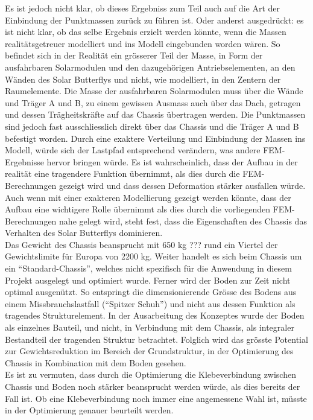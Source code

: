 Es ist jedoch nicht klar, ob dieses Ergebniss zum Teil auch auf die Art der Einbindung der Punktmassen zurück zu führen ist. Oder anderst ausgedrückt: es ist nicht klar, ob das selbe Ergebnis erzielt werden könnte, wenn die Massen realitätsgetreuer modelliert und ins Modell eingebunden worden wären. So befindet sich in der Realität ein grösserer Teil der Masse, in Form der ausfahrbaren Solarmodulen und den dazugehörigen Antriebselementen, an den Wänden des Solar Butterflys und nicht, wie modelliert, in den Zentern der Raumelemente.
Die Masse der ausfahrbaren Solarmodulen muss über die Wände und Träger A und B, zu einem gewissen Ausmass auch über das Dach, getragen und dessen Trägheitskräfte auf das Chassis übertragen werden. Die Punktmassen sind jedoch fast ausschliesslich direkt über das Chassis und die Träger A und B befestigt worden. Durch eine exaktere Verteilung und Einbindung der Massen ins Modell, würde sich der Lastpfad entsprechend verändern, was andere FEM-Ergebnisse hervor bringen würde.
Es ist wahrscheinlich, dass der Aufbau in der realität eine tragendere Funktion übernimmt, als dies durch die FEM-Berechnungen gezeigt wird und dass dessen Deformation stärker ausfallen würde.\\
Auch wenn mit einer exakteren Modellierung gezeigt werden könnte, dass der Aufbau eine wichtigere Rolle übernimmt als dies durch die vorliegenden FEM-Berechnungen nahe gelegt wird, steht fest, dass die Eigenschaften des Chassis das Verhalten des Solar Butterflys dominieren.\\

Das Gewicht des Chassis beansprucht mit 650 kg ??? rund ein Viertel der Gewichtslimite für Europa von 2200 kg. Weiter handelt es sich beim Chassis um ein ``Standard-Chassis'', welches nicht spezifisch für die Anwendung in diesem Projekt ausgelegt und optimiert wurde. Ferner wird der Boden zur Zeit nicht optimal ausgenützt. So entspringt die dimensionierende Grösse des Bodens aus einem Missbrauchslastfall (``Spitzer Schuh'') und nicht aus dessen Funktion als tragendes Strukturelement. In der Ausarbeitung des Konzeptes wurde der Boden als einzelnes Bauteil, und nicht, in Verbindung mit dem Chassis, als integraler Bestandteil der tragenden Struktur betrachtet. Folglich wird das grösste Potential zur Gewichtsreduktion im Bereich der Grundstruktur, in der Optimierung des Chassis in Kombination mit dem Boden gesehen.\\
Es ist zu vermuten, dass durch die Optimierung die Klebeverbindung zwischen Chassis und Boden noch stärker beansprucht werden würde, als dies bereits der Fall ist. Ob eine Klebeverbindung noch immer eine angemessene Wahl ist, müsste in der Optimierung genauer beurteilt werden.
\newpage

